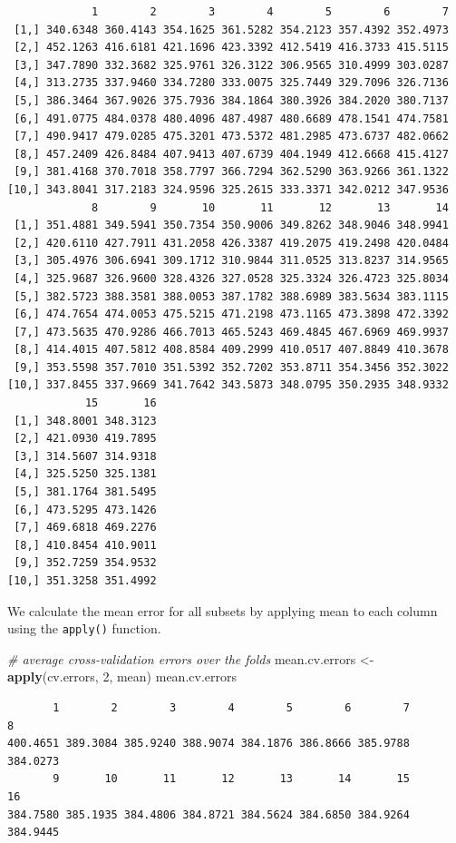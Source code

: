 \documentclass[]{article}
\newenvironment{Shaded}{\begin{snugshade}}{\end{snugshade}}
\newcommand{\CommentTok}[1]{\textcolor[rgb]{0.56,0.35,0.01}{\textit{#1}}}
\newcommand{\DecValTok}[1]{\textcolor[rgb]{0.00,0.00,0.81}{#1}}
\newcommand{\KeywordTok}[1]{\textcolor[rgb]{0.13,0.29,0.53}{\textbf{#1}}}
\newcommand{\NormalTok}[1]{#1}
\newcommand{\StringTok}[1]{\textcolor[rgb]{0.31,0.60,0.02}{#1}}
\begin{document}
\begin{verbatim}
             1        2        3        4        5        6        7
 [1,] 340.6348 360.4143 354.1625 361.5282 354.2123 357.4392 352.4973
 [2,] 452.1263 416.6181 421.1696 423.3392 412.5419 416.3733 415.5115
 [3,] 347.7890 332.3682 325.9761 326.3122 306.9565 310.4999 303.0287
 [4,] 313.2735 337.9460 334.7280 333.0075 325.7449 329.7096 326.7136
 [5,] 386.3464 367.9026 375.7936 384.1864 380.3926 384.2020 380.7137
 [6,] 491.0775 484.0378 480.4096 487.4987 480.6689 478.1541 474.7581
 [7,] 490.9417 479.0285 475.3201 473.5372 481.2985 473.6737 482.0662
 [8,] 457.2409 426.8484 407.9413 407.6739 404.1949 412.6668 415.4127
 [9,] 381.4168 370.7018 358.7797 366.7294 362.5290 363.9266 361.1322
[10,] 343.8041 317.2183 324.9596 325.2615 333.3371 342.0212 347.9536
             8        9       10       11       12       13       14
 [1,] 351.4881 349.5941 350.7354 350.9006 349.8262 348.9046 348.9941
 [2,] 420.6110 427.7911 431.2058 426.3387 419.2075 419.2498 420.0484
 [3,] 305.4976 306.6941 309.1712 310.9844 311.0525 313.8237 314.9565
 [4,] 325.9687 326.9600 328.4326 327.0528 325.3324 326.4723 325.8034
 [5,] 382.5723 388.3581 388.0053 387.1782 388.6989 383.5634 383.1115
 [6,] 474.7654 474.0053 475.5215 471.2198 473.1165 473.3898 472.3392
 [7,] 473.5635 470.9286 466.7013 465.5243 469.4845 467.6969 469.9937
 [8,] 414.4015 407.5812 408.8584 409.2999 410.0517 407.8849 410.3678
 [9,] 353.5598 357.7010 351.5392 352.7202 353.8711 354.3456 352.3022
[10,] 337.8455 337.9669 341.7642 343.5873 348.0795 350.2935 348.9332
            15       16
 [1,] 348.8001 348.3123
 [2,] 421.0930 419.7895
 [3,] 314.5607 314.9318
 [4,] 325.5250 325.1381
 [5,] 381.1764 381.5495
 [6,] 473.5295 473.1426
 [7,] 469.6818 469.2276
 [8,] 410.8454 410.9011
 [9,] 352.7259 354.9532
[10,] 351.3258 351.4992
\end{verbatim}

We calculate the mean error for all subsets by applying mean to each column using the \texttt{apply()} function.

\begin{Shaded}
\begin{Highlighting}[]
\CommentTok{# average cross-validation errors over the folds}
\NormalTok{mean.cv.errors <-}\StringTok{ }\KeywordTok{apply}\NormalTok{(cv.errors, }\DecValTok{2}\NormalTok{, mean)}
\NormalTok{mean.cv.errors}
\end{Highlighting}
\end{Shaded}

\begin{verbatim}
       1        2        3        4        5        6        7        8 
400.4651 389.3084 385.9240 388.9074 384.1876 386.8666 385.9788 384.0273 
       9       10       11       12       13       14       15       16 
384.7580 385.1935 384.4806 384.8721 384.5624 384.6850 384.9264 384.9445 
\end{verbatim}
\end{document}
